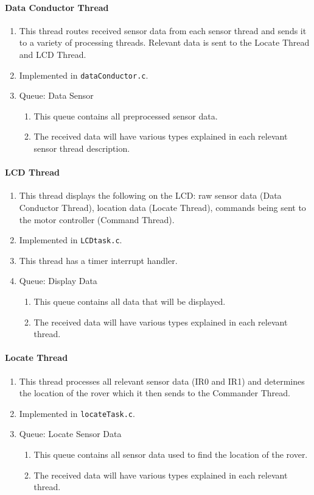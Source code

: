 \paragraph*{Data Conductor Thread}
\begin{enumerate}
	\item This thread routes received sensor data from each sensor thread and sends it to a variety of processing threads. Relevant data is sent to the Locate Thread and LCD Thread.
	\item Implemented in \texttt{dataConductor.c}.
	\item Queue: Data Sensor
	\begin{enumerate}
		\item This queue contains all preprocessed sensor data.
		\item The received data will have various types explained in each relevant sensor thread description.
	\end{enumerate}
\end{enumerate}

\paragraph*{LCD Thread}
\begin{enumerate}
	\item This thread displays the following on the LCD: raw sensor data (Data Conductor Thread), location data (Locate Thread), commands being sent to the motor controller (Command Thread).
	\item Implemented in \texttt{LCDtask.c}.
	\item This thread has a timer interrupt handler.
	\item Queue: Display Data
	\begin{enumerate}
		\item This queue contains all data that will be displayed.
		\item The received data will have various types explained in each relevant thread.
	\end{enumerate}
\end{enumerate}

\paragraph*{Locate Thread}
\begin{enumerate}
	\item This thread processes all relevant sensor data (IR0 and IR1) and determines the location of the rover which it then sends to the Commander Thread.
	\item Implemented in \texttt{locateTask.c}.
	\item Queue: Locate Sensor Data
	\begin{enumerate}
		\item This queue contains all sensor data used to find the location of the rover.
		\item The received data will have various types explained in each relevant thread.
	\end{enumerate}
\end{enumerate}

